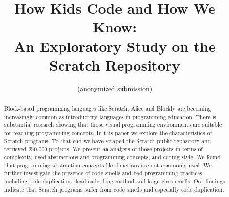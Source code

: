 \documentclass{sig-alternate}
\begin{document}
%

\title{How Kids Code and How We Know:\\An Exploratory Study on the Scratch Repository }

\author{
\alignauthor
(anonymized submission)
}


\maketitle
\begin{abstract}
Block-based programming languages like Scratch, Alice and Blockly are becoming increasingly common as introductory languages in programming education. There is substantial research showing that those visual programming environments are suitable for teaching programming concepts. In this paper we explore the characteristics of Scratch programs. To that end we have scraped the Scratch public repository and retrieved 250.000 projects. We present an analysis of those projects in terms of complexity, used abstractions and programming concepts, and coding style. We found that programming abstraction concepts like functions are not commonly used. We further investigate the presence of code smells and bad programming practices, including code duplication, dead code, long method and large class smells. Our findings indicate that Scratch programs suffer from code smells and especially code duplication.
\end{abstract}
\end{document}
